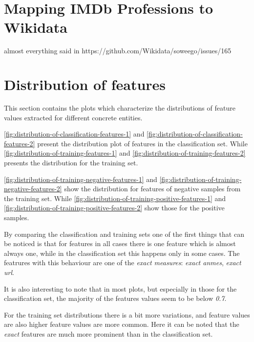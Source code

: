 \documentclass[epsfig,a4paper,11pt,titlepage,twoside,openany]{book}
\begin{document}
\section{Mapping IMDb Professions to Wikidata}
\label{sec:imdb-profs-to-wikidata}


almost everything said in https://github.com/Wikidata/soweego/issues/165


\section{Distribution of features}
\label{sec:apx-feature-distribution}



This section contains the plots which characterize the distributions of feature values extracted for different concrete entities. 

\autoref{fig:distribution-of-classification-features-1} and \autoref{fig:distribution-of-classification-features-2} present the distribution plot of features in the classification set. While \autoref{fig:distribution-of-training-features-1} and \autoref{fig:distribution-of-training-features-2} presents the distribution for the training set.

\autoref{fig:distribution-of-training-negative-features-1} and \autoref{fig:distribution-of-training-negative-features-2} show the distribution for features of negative samples from the training set. While \autoref{fig:distribution-of-training-positive-features-1} and \autoref{fig:distribution-of-training-positive-features-2} show those for the positive samples.

By comparing the classification and training sets one of the first things that can be noticed is that for features in all cases there is one feature which is almost always one, while in the classification set this happens only in some cases. The featrures with this behaviour are one of the \textit{exact measures}: \textit{exact anmes}, \textit{exact url}.

It is also interesting to note that in most plots, but especially in those for the classification set, the majority of the features values seem to be below \textit{0.7}.

For the training set distributions there is a bit more variations, and feature values are also higher feature values are more common. Here it can be noted that the \textit{exact} features are much more prominent than in the classification set. 
\end{document}
